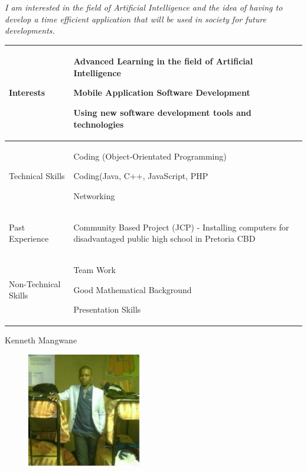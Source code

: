 \documentclass{article}
\begin{document}
 	\textit{I am interested in the field of Artificial Intelligence and the idea of having to develop a time efficient application that will be used in society for future developments.}

\begin{center}
\begin{tabularx}{1.0\textwidth}{|p{3cm}|X|}
\hline
 {\LARGE Interests} & 
 \begin{compactitem}
     \item {\large Advanced Learning in the field of Artificial Intelligence}
     \item {\large Mobile Application Software Development}
     \item {\large Using new software development tools and technologies}
 \end{compactitem} \\ 
 \hline
 {\LARGE Technical Skills} & 
 \begin{compactitem}
     \item {\large Coding (Object-Orientated Programming)} 
     \item {\large Coding(Java, C++, JavaScript, PHP}
     \item {\large Networking}
 \end{compactitem} \\ 
 \hline
 {\LARGE Past Experience} & 
 \begin{compactitem}
     \item {\large Community Based Project (JCP) - Installing computers for disadvantaged public high school in Pretoria CBD}
 \end{compactitem} \\ 
 \hline
 {\LARGE Non-Technical Skills} & 
 \begin{compactitem}
     \item {\large Team Work}
     \item {\large Good Mathematical Background}
     \item {\large Presentation Skills}
 \end{compactitem} \\
 \hline 
\end{tabularx}
\end{center}
\pagebreak
{\huge Kenneth Mangwane}
\begin{figure}[h]
\centering
\includegraphics[width=5cm, height=5cm]{Kenneth.eps} 
\end{figure}
\end{document}
